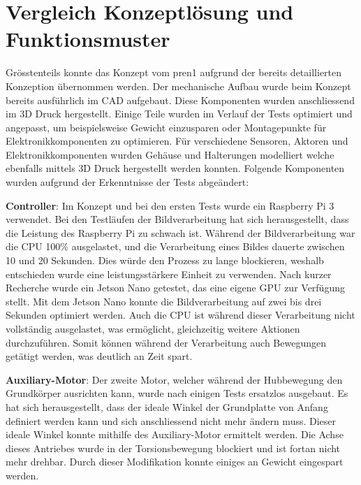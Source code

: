 \newpage

\section{Vergleich Konzeptlösung und Funktionsmuster}

Grösstenteils konnte das Konzept vom \acrshort{pren1} aufgrund der bereits detaillierten Konzeption übernommen werden. Der mechanische Aufbau wurde beim Konzept bereits ausführlich im CAD aufgebaut. Diese Komponenten wurden anschliessend im 3D Druck hergestellt. Einige Teile wurden im Verlauf der Tests optimiert und angepasst, um beispielsweise Gewicht einzusparen oder Montagepunkte für Elektronikkomponenten zu optimieren.
Für verschiedene Sensoren, Aktoren und Elektronikkomponenten wurden Gehäuse und Halterungen modelliert welche ebenfalls mittels 3D Druck hergestellt werden konnten. Folgende Komponenten wurden aufgrund der Erkenntnisse der Tests abgeändert:

\textbf{Controller}:
Im Konzept und bei den ersten Tests wurde ein Raspberry Pi 3 verwendet. Bei den Testläufen der Bildverarbeitung hat sich herausgestellt, dass die Leistung des Raspberry Pi zu schwach ist. Während der Bildverarbeitung war die CPU 100\% ausgelastet, und die Verarbeitung eines Bildes dauerte zwischen 10 und 20 Sekunden. Dies würde den Prozess zu lange blockieren, weshalb entschieden wurde eine leistungsstärkere Einheit zu verwenden. Nach kurzer Recherche wurde ein Jetson Nano getestet, das eine eigene GPU zur Verfügung stellt. Mit dem Jetson Nano konnte die Bildverarbeitung auf zwei bis drei Sekunden optimiert werden. Auch die CPU ist während dieser Verarbeitung nicht vollständig ausgelastet, was ermöglicht, gleichzeitig weitere Aktionen durchzuführen. Somit können während der Verarbeitung auch Bewegungen getätigt werden, was deutlich an Zeit spart.

\textbf{Auxiliary-Motor}:
Der zweite Motor, welcher während der Hubbewegung den Grundkörper ausrichten kann, wurde nach einigen Tests ersatzlos ausgebaut. Es hat sich herausgestellt, dass der ideale Winkel der Grundplatte von Anfang definiert werden kann und sich anschliessend nicht mehr ändern muss. Dieser ideale Winkel konnte mithilfe des Auxiliary-Motor ermittelt werden. Die Achse dieses Antriebes wurde in der Torsionsbewegung blockiert und ist fortan nicht mehr drehbar. Durch dieser Modifikation konnte einiges an Gewicht eingespart werden. 


